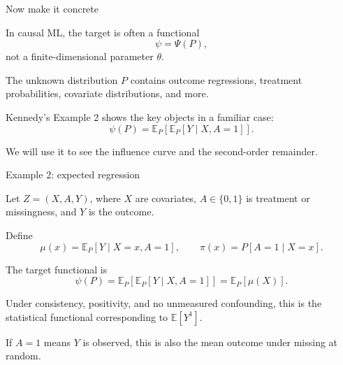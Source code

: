 \documentclass[xcolor={table}, handout]{beamer}
\begin{document}
\note{
\scriptsize \singlespacing

}
\begin{frame}{Now make it concrete}

\begin{wideitemize}
\item In causal ML, the target is often a functional
\[
\psi=\Psi(P),
\]
not a finite-dimensional parameter $\theta$.\pause
\item The unknown distribution $P$ contains outcome regressions, treatment probabilities, covariate distributions, and more.\pause
\item Kennedy's Example 2 shows the key objects in a familiar case:
\[
\psi(P)=\mathbb{E}_P[\mathbb{E}_P[Y\mid X,A=1]].
\]\pause
\item We will use it to see the influence curve and the second-order remainder.
\end{wideitemize}

\end{frame}

\note{
\scriptsize \singlespacing

}
\begin{frame}{Example 2: expected regression}

\small

\begin{wideitemize}
\item Let $Z=(X,A,Y)$, where $X$ are covariates, $A\in\{0,1\}$ is treatment or missingness, and $Y$ is the outcome.\pause
\item Define
\[
\mu(x)=\mathbb{E}_P[Y\mid X=x,A=1],
\qquad
\pi(x)=P[A=1\mid X=x].
\]\pause
\item The target functional is
\[
\psi(P)
  =
  \mathbb{E}_P[\mathbb{E}_P[Y\mid X,A=1]]
  =
  \mathbb{E}_P[\mu(X)].
\]\pause
\item Under consistency, positivity, and no unmeasured confounding, this is the statistical functional corresponding to $\mathbb{E}[Y^1]$.\pause
\item If $A=1$ means $Y$ is observed, this is also the mean outcome under missing at random.
\end{wideitemize}

\end{frame}
\end{document}

